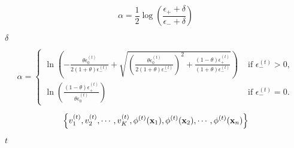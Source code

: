 \documentclass{article}
\begin{document}
\[ \alpha = \frac{1}{2} \log \left( \frac{\epsilon_+ + \delta}{\epsilon_- + \delta} \right) \]
\pagebreak

$\delta$
\pagebreak

\[ \alpha = \begin{cases} \ln\left( - \frac{\theta\epsilon^{(t)}_{0}}{2(1+\theta)\epsilon^{(t)}_{-}} + \sqrt{\left(\frac{\theta\epsilon^{(t)}_{0}}{2(1+\theta)\epsilon^{(t)}_{-}}\right)^2 + \frac{(1 - \theta)\epsilon^{(t)}_{+}}{(1 + \theta)\epsilon^{(t)}_{-}}}\right) & \mbox{ if } \epsilon^{(t)}_{-} > 0,\\ \ln\left( \frac{(1-\theta)\epsilon^{(t)}_{+}}{\theta\epsilon^{(t)}_{0}}\right) & \mbox{ if } \epsilon^{(t)}_{-} = 0. \end{cases} \]
\pagebreak

\[ \left\{ v^{(t)}_1, v^{(t)}_2, \cdots, v^{(t)}_K, \phi^{(t)}({\bf x}_1), \phi^{(t)}({\bf x}_2), \cdots, \phi^{(t)}({\bf x}_n) \right\} \]
\pagebreak

$t$
\pagebreak
\end{document}
